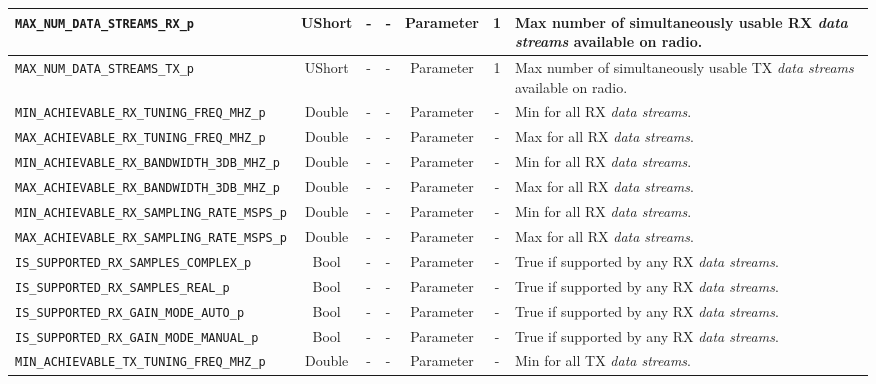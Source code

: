 \documentclass{article}
\begin{document}
\begin{landscape}
\begin{scriptsize}
\begin{longtable}{|p{5.3cm}|c|p{3.5cm}|p{3.5cm}|c|c|p{4.4cm}|}
			\hline
			\verb+MAX_NUM_DATA_STREAMS_RX_p+        & UShort & -        & -          & Parameter           & 1       & Max number of simultaneously usable RX \textit{data streams} available on radio. \\
			\hline
			\verb+MAX_NUM_DATA_STREAMS_TX_p+        & UShort & -        & -          & Parameter           & 1       & Max number of simultaneously usable TX \textit{data streams} available on radio.  \\
			\hline
			\verb+MIN_ACHIEVABLE_RX_TUNING_FREQ_MHZ_p+        & Double & -        & - & Parameter          & -       & Min for all RX \textit{data streams}. \\
			\hline
			\verb+MAX_ACHIEVABLE_RX_TUNING_FREQ_MHZ_p+        & Double & -        & - & Parameter           & -       & Max for all RX \textit{data streams}. \\
			\hline
			\verb+MIN_ACHIEVABLE_RX_BANDWIDTH_3DB_MHZ_p+      & Double & -        & - & Parameter           & -       & Min for all RX \textit{data streams}. \\
			\hline
			\verb+MAX_ACHIEVABLE_RX_BANDWIDTH_3DB_MHZ_p+      & Double & -        & - & Parameter           & -       & Max for all RX \textit{data streams}. \\
			\hline
			\verb+MIN_ACHIEVABLE_RX_SAMPLING_RATE_MSPS_p+      & Double & -        & - & Parameter           & -       & Min for all RX \textit{data streams}. \\
			\hline
			\verb+MAX_ACHIEVABLE_RX_SAMPLING_RATE_MSPS_p+      & Double & -        & - & Parameter           & -       & Max for all RX \textit{data streams}. \\
			\hline
			\verb+IS_SUPPORTED_RX_SAMPLES_COMPLEX_p+           & Bool   & -        & - & Parameter           & -       & True if supported by any RX \textit{data streams}. \\
			\hline
			\verb+IS_SUPPORTED_RX_SAMPLES_REAL_p+              & Bool   & -        & - & Parameter           & -       & True if supported by any RX \textit{data streams}. \\
			\hline
			\verb+IS_SUPPORTED_RX_GAIN_MODE_AUTO_p+            & Bool   & -        & - & Parameter           & -       & True if supported by any RX \textit{data streams}. \\
			\hline
			\verb+IS_SUPPORTED_RX_GAIN_MODE_MANUAL_p+          & Bool   & -        & - & Parameter           & -       & True if supported by any RX \textit{data streams}. \\
			\hline
			\verb+MIN_ACHIEVABLE_TX_TUNING_FREQ_MHZ_p+        & Double & -        & - & Parameter           & -       & Min for all TX \textit{data streams}. \\

\end{longtable}
\end{scriptsize}
\end{landscape}
\end{document}
